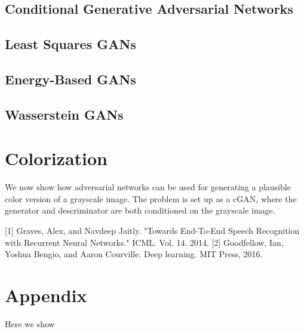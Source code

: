 \documentclass{article}
\begin{document}
\subsection{Conditional Generative Adversarial Networks}


\subsection{Least Squares GANs}


\subsection{Energy-Based GANs}


\subsection{Wasserstein GANs}


\section{Colorization}
We now show how adversarial networks can be used for generating a plausible color version of a grayscale image.
The problem is set up as a cGAN, where the generator and descriminator are both conditioned on the grayscale image.







[1] Graves, Alex, and Navdeep Jaitly. "Towards End-To-End Speech Recognition with Recurrent Neural Networks." ICML. Vol. 14. 2014.
[2] Goodfellow, Ian, Yoshua Bengio, and Aaron Courville. Deep learning. MIT Press, 2016.


\appendix

\section{Appendix}
Here we show 
\end{document}
